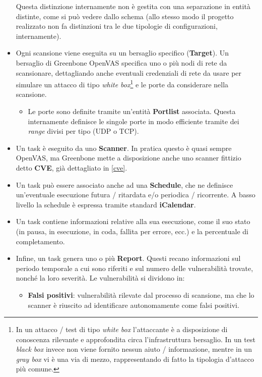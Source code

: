 \begin{itemize}
\begin{itemize}
    \end{itemize}
    Questa distinzione internamente non è gestita con una separazione in entità distinte, come si può vedere dallo schema (allo stesso modo il progetto realizzato non fa distinzioni tra le due tipologie di configurazioni, internamente).
    \item Ogni scansione viene eseguita su un bersaglio specifico (\textbf{Target}). Un bersaglio di Greenbone OpenVAS specifica uno o più nodi di rete da scansionare, dettagliando anche eventuali credenziali di rete da usare per simulare un attacco di tipo \emph{white box}\footnote{In un attacco / test di tipo \emph{white box} l'attaccante è a disposizione di conoscenza rilevante e approfondita circa l'infrastruttura bersaglio. In un test \emph{black box} invece non viene fornito nessun aiuto / informazione, mentre in un \emph{gray box} vi è una via di mezzo, rappresentando di fatto la tipologia d'attacco più comune.} e le porte da considerare nella scansione.
    \begin{itemize}
        \item Le porte sono definite tramite un'entità \textbf{Portlist} associata. Questa internamente definisce le singole porte in modo efficiente tramite dei \emph{range} divisi per tipo (UDP o TCP).
    \end{itemize}
    \item Un task è eseguito da uno \textbf{Scanner}. In pratica questo è quasi sempre OpenVAS, ma Greenbone mette a disposizione anche uno scanner fittizio detto \textbf{CVE}, già dettagliato in \ref{cve}.
    \item Un task può essere associato anche ad una \textbf{Schedule}, che ne definisce un'eventuale esecuzione futura / ritardata e/o periodica / ricorrente. A basso livello la schedule è espressa tramite standard \textbf{iCalendar}.
    \item Un task contiene informazioni relative alla sua esecuzione, come il suo stato (in pausa, in esecuzione, in coda, fallita per errore, ecc.) e la percentuale di completamento.
    \item Infine, un task genera uno o più \textbf{Report}. Questi recano informazioni sul periodo temporale a cui sono riferiti e sul numero delle vulnerabilità trovate, nonché la loro severità. Le vulnerabilità si dividono in:
    \begin{itemize}
        \item \textbf{Falsi positivi}: vulnerabilità rilevate dal processo di scansione, ma che lo scanner è riuscito ad identificare autonomamente come falsi positivi.

\end{itemize}
\end{itemize}
